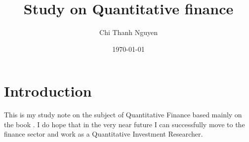 \documentclass[11pt,a4paper]{report}
\begin{document}
\title{Study on Quantitative finance}
\author{Chi Thanh Nguyen}
\date{\today \@ \currenttime}
\maketitle

\tableofcontents


\chapter{Introduction}
This is my study note on the subject of Quantitative Finance based mainly on the book \cite{pw_iqf2ed_2007}. I do hope that in the very near future I can successfully move to the finance sector and work as a Quantitative Investment Researcher. 


\appendix 









\printindex



\end{document}
